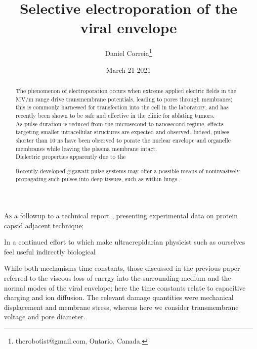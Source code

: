 \documentclass[fleqn,10pt]{paper}
\begin{document}
\title{Selective electroporation of the viral envelope}
\author{\footnotesize{Daniel Correia}\footnote{therobotist@gmail.com, Ontario, Canada.}}
\date{\small{March 21 2021}}

\flushbottom 
\maketitle



\thispagestyle{empty}

\renewcommand{\abstractname}{Summary}    %

\begin{abstract}
	\noindent The phenomenon of electroporation occurs when extreme applied electric fields in the MV/m range drive transmembrane potentials, leading to pores through membranes; this is commonly harnessed for transfection into the cell in the laboratory, and has recently been shown to be safe and effective in the clinic for ablating tumors.\\
	
	\noindent As pulse duration is reduced from the microsecond to nanosecond regime, effects targeting smaller intracellular structures are expected and observed. Indeed, pulses shorter than 10 ns have been observed to porate the nuclear envelope and organelle membranes while leaving the plasma membrane intact. \\
	
	Dielectric properties apparently due to the 
	
	\noindent Recently-developed gigawatt pulse systems may offer a possible means of noninvasively propagating such pulses into deep tissues, such as within lungs. 
\end{abstract}

\lettrine{A}{s} a followup to a technical report \cite{notes2021}, presenting experimental data on protein capsid adjacent technique; 

In a continued effort to which make ultracrepidarian physicist such as ourselves feel useful indirectly biological 

While both mechanisms time constants, those discussed in the previous paper referred to the viscous loss of energy into the surrounding medium and the normal modes of the viral envelope; here the time constants relate to capacitive charging and ion diffusion. The relevant damage quantities were mechanical displacement and membrane stress, whereas here we consider transmembrane voltage and pore diameter. 
\end{document}
